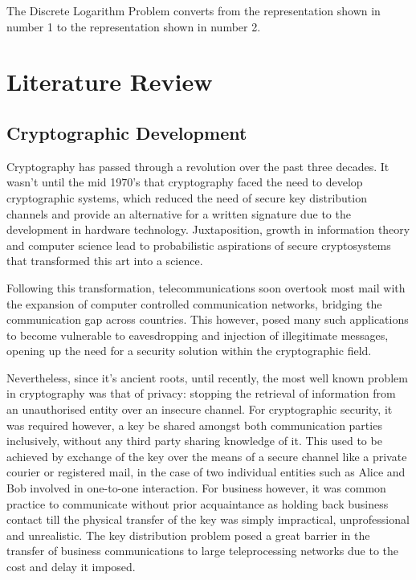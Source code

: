 \documentclass[iwp,first]{luthesis}
\begin{document}
The Discrete Logarithm Problem converts from the representation shown in number 1 to the representation shown in number 2.




\chapter{Literature Review}

\section{Cryptographic Development}

Cryptography has passed through a revolution over the past three decades. It wasn't until the mid 1970's that cryptography faced the need to develop cryptographic systems, which reduced the need of secure key distribution channels and provide an alternative for a written signature due to the development in hardware technology. Juxtaposition, growth in information theory and computer science lead to probabilistic aspirations of secure cryptosystems that transformed this art into a science.

Following this transformation, telecommunications soon overtook most mail with the expansion of computer controlled communication networks, bridging the communication gap across countries. This however, posed many such applications to become vulnerable to eavesdropping and injection of illegitimate messages, opening up the need for a security solution within the cryptographic field.

Nevertheless, since it's ancient roots, until recently, the most well known problem in cryptography was that of privacy: stopping the retrieval of information from an unauthorised entity over an insecure channel. For cryptographic security, it was required however, a key be shared amongst both communication parties inclusively, without any third party sharing knowledge of it. This used to be achieved by exchange of the key over the means of a secure channel like a private courier or registered mail, in the case of two individual entities such as Alice and Bob involved in one-to-one interaction. For business however, it was common practice to communicate without prior acquaintance as holding back business contact till the physical transfer of the key was simply impractical, unprofessional and unrealistic. The key distribution problem posed a great barrier in the transfer of business communications to large teleprocessing networks due to the cost and delay it imposed. 
\end{document}
